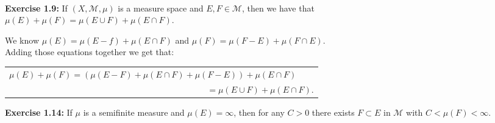 \documentclass{book}
\newcommand{\exOne}{%
   \color{Purple}%
   \fontsize{13}{15}\selectfont%
}
\newcommand{\exTwoP}{%
   \color{RedViolet}%
   \fontsize{13}{15}\selectfont%
}
\newenvironment{myIndent}{%
   \begin{adjustwidth}{2.5em}{0em}%
}{%
   \end{adjustwidth}%
}
\newcommand{\blab}[1]{\textbf{#1}}
\newcommand{\mySepTwo}[1][.]{%
   {\noindent\color{#1}{\rule{6.5in}{0.5mm}}}\\%
}
\newcommand{\retTwo}{\hfill\bigbreak}
\begin{document}
\exOne\mySepTwo

\blab{Exercise 1.9:} If $(X, \mathcal{M}, \mu)$ is a measure space and $E, F \in \mathcal{M}$, then we have that\\ $\mu(E) + \mu(F) = \mu(E \cup F) + \mu(E \cap F)$.

\begin{myIndent}\exTwoP
   We know $\mu(E) = \mu(E - f) + \mu(E \cap F)$ and $\mu(F) = \mu(F - E) + \mu(F \cap E)$.\\ Adding those equations together we get that:

   {\centering
   \begin{tabular}{l}
       $\mu(E) + \mu(F) = (\mu(E - F) + \mu(E \cap F) + \mu(F - E)) + \mu(E \cap F)$\\ $\phantom{\mu(E) + \mu(F) = (\mu(E - F) + \mu(E \cap F)) + a} = \mu(E \cup F) + \mu(E \cap F)$.
   \end{tabular}\retTwo\par}
\end{myIndent}

\blab{Exercise 1.14:} If $\mu$ is a semifinite measure and $\mu(E) = \infty$, then for any $C > 0$ there exists $F \subset E$ in $\mathcal{M}$ with $C < \mu(F) < \infty$.
\end{document}
